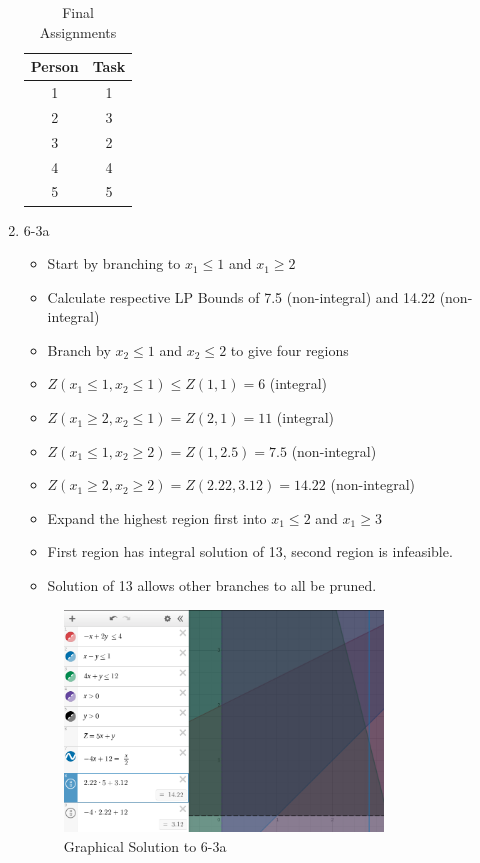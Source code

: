\documentclass[12pt, letter]{article}
\begin{document}
\begin{enumerate}
\begin{enumerate}
	\end{enumerate}
	\begin{table}[h]
		\centering
		\caption{Final Assignments}
		\label{tab:label}
		\begin{tabular}{cc}
		Person & Task \\
		\hline
		1 & 1 \\
		2 & 3 \\
		3 & 2 \\
		4 & 4 \\
		5 & 5 \\
		\end{tabular}
	\end{table}
	\item 6-3a
	\begin{itemize}
		\item Start by branching to $x_1\le 1$ and $x_1\ge 2$
		\item Calculate respective LP Bounds of 7.5 (non-integral) and 14.22 (non-integral)
		\item Branch by $x_2 \le 1$ and $x_2 \le 2$ to give four regions
		\item $Z(x_1\le 1,x_2 \le 1) \le Z(1,1)=6$ (integral)
		\item $Z(x_1\ge 2, x_2 \le 1) = Z(2,1) = 11$ (integral)
		\item $Z(x_1 \le 1, x_2 \ge 2) = Z(1,2.5) = 7.5$ (non-integral)
		\item $Z(x_1 \ge 2, x_2 \ge 2) = Z(2.22,3.12) = 14.22$ (non-integral)
		\item Expand the highest region first into $x_1 \le 2$ and $x_1 \ge 3$
		\item First region has integral solution of 13, second region is infeasible.
		\item Solution of 13 allows other branches to all be pruned.
	\end{itemize}
	\begin{figure}[h]
		\centering
		\includegraphics[width=0.8\textwidth]{6-8}
		\caption{Graphical Solution to 6-3a}
		\label{fig:6-8}
	\end{figure}


\end{enumerate}
\end{document}
